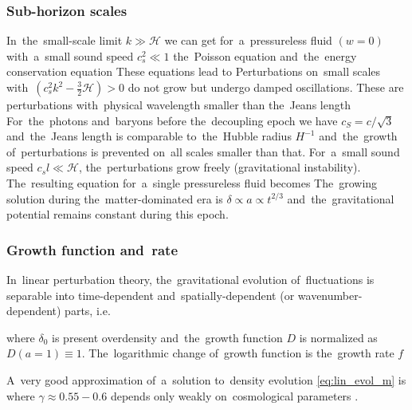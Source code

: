 \subsubsection{Sub-horizon scales}
In~the~small-scale limit $k\gg\mathcal{H}$ we can get for~a~pressureless fluid $(w=0)$ with~a~small sound speed $c_s^2\ll1$ the~Poisson equation
and~the~energy conservation equation
These equations lead to
Perturbations on~small scales with~$(c_s^2k^2-\frac32\mathcal{H})>0$ do not grow but undergo damped oscillations. These are perturbations with~physical wavelength smaller than the~Jeans length
For~the~photons and~baryons before the~decoupling epoch we have $c_S=c/\sqrt3$ and~the~Jeans length is comparable to~the~Hubble radius $H^{-1}$ and~the~growth of~perturbations is prevented on~all scales smaller than that. For~a~small sound speed $c_sl\ll\mathcal{H}$, the~perturbations grow freely (gravitational instability). The~resulting equation for~a~single pressureless fluid becomes
The~growing solution during the~matter-dominated era is $\delta\propto a\propto t^{2/3}$ and~the~gravitational potential remains constant during this epoch.

\subsubsection{Growth function and~rate}
In~linear perturbation theory, the~gravitational evolution of~fluctuations is separable into time-dependent and~spatially-dependent (or wavenumber-dependent) parts, i.e.
\begin{sloppypar}
where $\delta_0$ is present overdensity and~the~growth function $D$ is normalized as ${D(a=1)\equiv1}$. The~logarithmic change of~growth function is the~growth rate $f$
\end{sloppypar}
 A~very good approximation of~a~solution to~density evolution \eqref{eq:lin_evol_m} is
where $\gamma\approx0.55-0.6$ depends only weakly on~cosmological parameters \parencite{1980_Peebles}.


